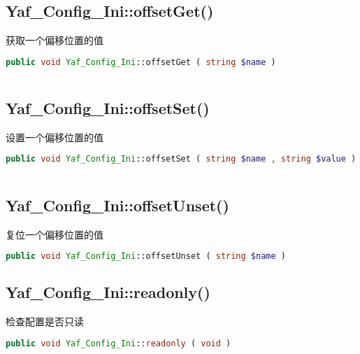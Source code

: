\begin{lstlisting}[language=PHP]

\end{lstlisting}



\subsection{Yaf\_Config\_Ini::offsetGet()}

获取一个偏移位置的值

\begin{lstlisting}[language=PHP]
public void Yaf_Config_Ini::offsetGet ( string $name )
\end{lstlisting}

\begin{lstlisting}[language=PHP]

\end{lstlisting}


\subsection{Yaf\_Config\_Ini::offsetSet()}

设置一个偏移位置的值

\begin{lstlisting}[language=PHP]
public void Yaf_Config_Ini::offsetSet ( string $name , string $value )
\end{lstlisting}

\begin{lstlisting}[language=PHP]

\end{lstlisting}


\subsection{Yaf\_Config\_Ini::offsetUnset()}

复位一个偏移位置的值

\begin{lstlisting}[language=PHP]
public void Yaf_Config_Ini::offsetUnset ( string $name )
\end{lstlisting}


\subsection{Yaf\_Config\_Ini::readonly()}

检查配置是否只读

\begin{lstlisting}[language=PHP]
public void Yaf_Config_Ini::readonly ( void )
\end{lstlisting}

